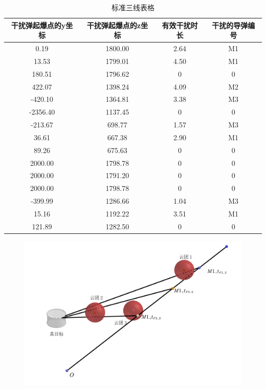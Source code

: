 \documentclass[../main.tex]{subfiles}
\begin{document}
\begin{table}[H]
\caption{标准三线表格}
\label{tab:031} 
\centering
\begin{small}
\begin{tabular}{cccc}
\toprule[1.5pt]
干扰弹起爆点的y坐标&干扰弹起爆点的z坐标&有效干扰时长 &干扰的导弹编号\\
\midrule[1pt]
0.19    & 1800.00 & 2.64 & M1 \\
    13.53   & 1799.01 & 4.50 & M1 \\
    180.51  & 1796.62 & 0    & 0 \\
    422.07  & 1398.24 & 4.09 & M2 \\
    -420.10 & 1364.81 & 3.38 & M3 \\
    -2356.40& 1137.45 & 0    & 0 \\
    -213.67 & 698.77  & 1.57 & M3 \\
    36.61   & 667.38  & 2.90 & M1 \\
    89.26   & 675.63  & 0    & 0 \\
    2000.00 & 1798.78 & 0    & 0 \\
    2000.00 & 1791.20 & 0    & 0 \\
    2000.00 & 1798.78 & 0    & 0 \\
    -399.99 & 1286.66 & 1.04 & M3 \\
    15.16   & 1192.22 & 3.51 & M1 \\
    121.89  & 1282.50 & 0    & 0 \\             
\bottomrule[1.5pt]
\end{tabular}
\end{small}
\end{table}
\begin{figure}[H]
\centering
\includegraphics[scale=0.5]{图三.png}
\caption{}
\label{图3}
\end{figure}
\end{document}
